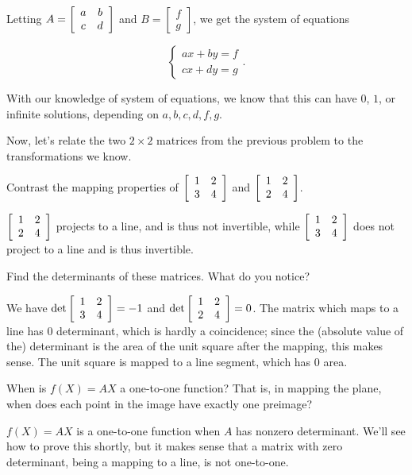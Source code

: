 \documentclass[../key.tex]{subfiles}
\begin{document}
Letting $A=\left[\begin{array}{cc} a & b \\ c & d \end{array}\right]$ and $B=\begin{bmatrix} f \\ g \end{bmatrix}$, we get the system of equations

$$\begin{cases} ax + by = f \\ cx+dy = g \end{cases}.$$

With our knowledge of system of equations, we know that this can have $0$, $1$, or infinite solutions, depending on $a,b,c,d,f,g$.

\begin{outer_problem}
\item Now, let's relate the two $2\times 2$ matrices from the previous problem to the transformations we know.
\end{outer_problem}

\begin{inner_problem}[start=1]
\item Contrast the mapping properties of $\left[\begin{array}{cc} 1 & 2 \\ 3 & 4 \end{array}\right]$ and $\left[\begin{array}{cc} 1 & 2 \\ 2 & 4 \end{array}\right]$.
\end{inner_problem}

$\left[\begin{array}{cc} 1 & 2 \\ 2 & 4 \end{array}\right]$ projects to a line, and is thus not invertible, while $\left[\begin{array}{cc} 1 & 2 \\ 3 & 4 \end{array}\right]$ does not project to a line and is thus invertible.

\begin{inner_problem}
\item Find the determinants of these matrices. What do you notice?
\end{inner_problem}

We have $\det \left[\begin{array}{cc} 1 & 2 \\ 3 & 4 \end{array}\right] = -1$ and $\det \left[\begin{array}{cc} 1 & 2 \\ 2 & 4 \end{array}\right]=0$. The matrix which maps to a line has $0$ determinant, which is hardly a coincidence; since the (absolute value of the) determinant is the area of the unit square after the mapping, this makes sense. The unit square is mapped to a line segment, which has $0$ area.

\begin{inner_problem}
\item When is $f(X)=AX$ a one-to-one function? That is, in mapping the plane, when does each point in the image have exactly one preimage?
\end{inner_problem}

$f(X)=AX$ is a one-to-one function when $A$ has nonzero determinant. We'll see how to prove this shortly, but it makes sense that a matrix with zero determinant, being a mapping to a line, is not one-to-one.
\end{document}
